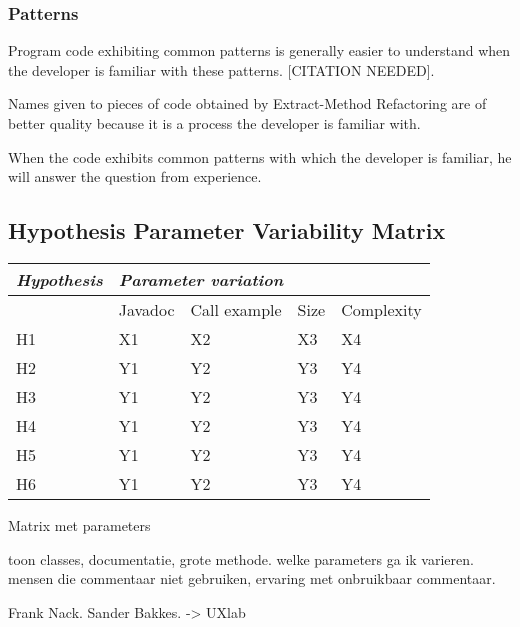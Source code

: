 



\subsubsection{Patterns}
Program code exhibiting common patterns is generally easier to understand when the developer is familiar with these patterns. {\color{red}[CITATION NEEDED]}.
\begin{subhyp}
	\begin{hyp}
		Names given to pieces of code obtained by Extract-Method Refactoring are of better quality because it is a process the developer is familiar with.
	\end{hyp}
	\begin{hyp}
		When the code exhibits common patterns with which the developer is familiar, he will answer the question from experience. 
	\end{hyp}
\end{subhyp}


\subsection{Hypothesis Parameter Variability Matrix}

\begin{tabular}{ *5l }
\emph{Hypothesis} & \multicolumn{4}{l}{\emph{Parameter variation}} \\
\hline
   & Javadoc  & Call example  & Size  & Complexity \\ 
H1 & X1 & X2 & X3 & X4 \\ 
H2 & Y1 & Y2 & Y3 & Y4 \\
H3 & Y1 & Y2 & Y3 & Y4 \\
H4 & Y1 & Y2 & Y3 & Y4 \\
H5 & Y1 & Y2 & Y3 & Y4 \\
H6 & Y1 & Y2 & Y3 & Y4 \\
\hline
\end{tabular}

Matrix met parameters

toon classes, documentatie, grote methode. welke parameters ga ik varieren. mensen die commentaar niet gebruiken, ervaring met onbruikbaar commentaar.

Frank Nack. Sander Bakkes. -> UXlab